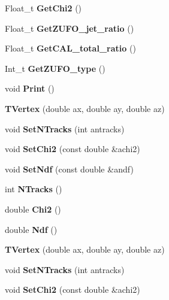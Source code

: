 \begin{CompactItemize}
\item 
Float\_\-t \textbf{Get\-Chi2} ()\label{classTVertex_eebd0ba6a2f24d745dee77727a514e1b}

\item 
Float\_\-t \textbf{Get\-ZUFO\_\-jet\_\-ratio} ()\label{classTVertex_9dd0cc3f2f189d5f1ce29dddd4ea7bef}

\item 
Float\_\-t \textbf{Get\-CAL\_\-total\_\-ratio} ()\label{classTVertex_27db208e6bd1e11b4b602b8f1f9a2e9c}

\item 
Int\_\-t \textbf{Get\-ZUFO\_\-type} ()\label{classTVertex_e1222d133d8b4b26a8cfc43cb68515f0}

\item 
void \textbf{Print} ()\label{classTVertex_139e7de94a425d2c97a0d8d8006d1cba}

\item 
\textbf{TVertex} (double ax, double ay, double az)\label{classTVertex_68c048d3c4adf5db80da0a63167d920c}

\item 
void \textbf{Set\-NTracks} (int antracks)\label{classTVertex_6055513ece070c2367ef84e9d6eff498}

\item 
void \textbf{Set\-Chi2} (const double \&achi2)\label{classTVertex_030cf7d93fe6d871b0ac78fe751b29bd}

\item 
void \textbf{Set\-Ndf} (const double \&andf)\label{classTVertex_a190c8dd6ca8e8789149d1556541c7b9}

\item 
int \textbf{NTracks} ()\label{classTVertex_06e89217c8f6756bdd2aaa3f0a870ed4}

\item 
double \textbf{Chi2} ()\label{classTVertex_dbedf19276ec1d01662c98c32742dfc2}

\item 
double \textbf{Ndf} ()\label{classTVertex_51885e0e598abdc758f44c85b2653ba2}

\item 
\textbf{TVertex} (double ax, double ay, double az)\label{classTVertex_68c048d3c4adf5db80da0a63167d920c}

\item 
void \textbf{Set\-NTracks} (int antracks)\label{classTVertex_6055513ece070c2367ef84e9d6eff498}

\item 
void \textbf{Set\-Chi2} (const double \&achi2)\label{classTVertex_030cf7d93fe6d871b0ac78fe751b29bd}


\end{CompactItemize}
